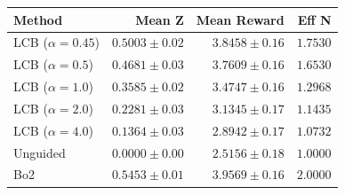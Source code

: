 \begin{tabular}{lrrr}
\hline
Method & Mean Z & Mean Reward & Eff N \\
\hline
LCB ($\alpha=0.45$) & $0.5003 \pm 0.02$ & $3.8458 \pm 0.16$ & $1.7530$ \\
LCB ($\alpha=0.5$) & $0.4681 \pm 0.03$ & $3.7609 \pm 0.16$ & $1.6530$ \\
LCB ($\alpha=1.0$) & $0.3585 \pm 0.02$ & $3.4747 \pm 0.16$ & $1.2968$ \\
LCB ($\alpha=2.0$) & $0.2281 \pm 0.03$ & $3.1345 \pm 0.17$ & $1.1435$ \\
LCB ($\alpha=4.0$) & $0.1364 \pm 0.03$ & $2.8942 \pm 0.17$ & $1.0732$ \\
Unguided & $0.0000 \pm 0.00$ & $2.5156 \pm 0.18$ & $1.0000$ \\
Bo2 & $0.5453 \pm 0.01$ & $3.9569 \pm 0.16$ & $2.0000$ \\
\hline
\end{tabular}
